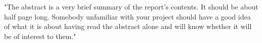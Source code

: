 


"The abstract is a very brief summary of the report's contents. It should be about half page long. Somebody unfamiliar with your project should have a good idea of what it is about having read the abstract alone and will know whether it will be of interest to them."